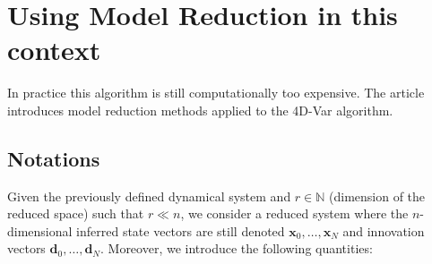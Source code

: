 \documentclass[a4paper,10pt]{article}
\newcommand{\bx}{{\boldsymbol x}}
\newcommand{\bd}{{\boldsymbol d}}
\newcommand{\mathN}{\mathbb{N}}
\begin{document}
\section{Using Model Reduction in this context}

In practice this algorithm is still computationally too expensive. The article introduces model reduction methods applied to the 4D-Var algorithm.

\subsection{Notations}

Given the previously defined dynamical system and $r \in \mathN$ (dimension of the reduced space) such that $r \ll n$, we consider a reduced system where the $n$-dimensional inferred state vectors are still denoted $\bx_0, \dots, \bx_N$ and innovation vectors $\bd_0, \dots, \bd_N$. Moreover, we introduce the following quantities:
\end{document}
